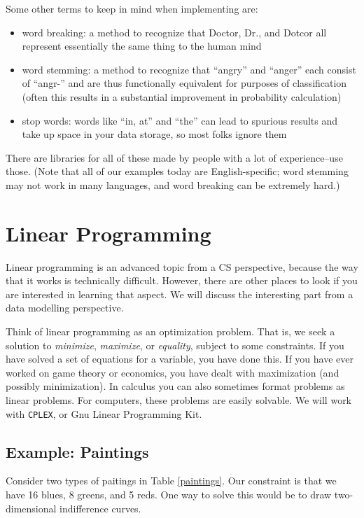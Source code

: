 \documentclass[12pt,letter]{article}
\begin{document}
Some other terms to keep in mind when implementing are:
\begin{itemize}
\item word breaking: a method to recognize that Doctor, Dr., and Dotcor all
represent essentially the same thing to the human mind
\item word stemming: a method to recognize that ``angry'' and
  ``anger'' each consist of ``angr-'' and are thus functionally
  equivalent for purposes of classification (often this results in a
  substantial improvement in probability calculation)
\item stop words: words like ``in, at'' and ``the'' can lead to
  spurious results and take up space in your data storage, so most
  folks ignore them
\end{itemize}

There are libraries for all of these made by people with a lot of
experience--use those. (Note that all of our examples today are
English-specific; word stemming may not work in many languages, and
word breaking can be extremely hard.) 


\section{Linear Programming}

Linear programming is an advanced topic from a CS perspective, because
the way that it works is technically difficult. However, there are
other places to look if you are interested in learning that aspect. We
will discuss the interesting part from a data modelling perspective. 

Think of linear programming as an optimization problem. That is, we
seek a solution to \emph{minimize}, \emph{maximize}, or
\emph{equality}, subject to some constraints. If you have solved a set
of equations for a variable, you have done this. If you have ever
worked on game theory or economics, you have dealt with maximization
(and possibly minimization). In calculus you can also sometimes format
problems as linear problems. For computers, these problems are easily
solvable. We will work with \texttt{CPLEX}, or Gnu Linear Programming
Kit. 

\subsection{Example: Paintings}
Consider two types of paitings in Table \ref{paintings}. Our
constraint is that we have 16 blues, 8 greens, and 5 reds. One way to
solve this would be to draw two-dimensional indifference curves. 
\end{document}
